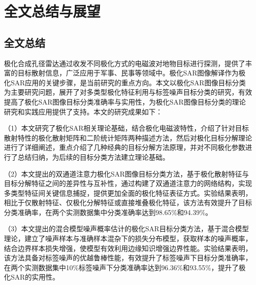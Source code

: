 \chapter{全文总结与展望}
\section{全文总结}
极化合成孔径雷达通过收发不同极化方式的电磁波对地物目标进行探测，提供了丰富的目标散射信息，广泛应用于军事、民事等领域中。极化SAR图像解译作为极化SAR应用的关键步骤，是当前研究的重点方向。本文以极化SAR图像目标分类为主要研究问题，展开了对多类型极化特征利用与标签噪声目标分类的研究，有效提高了极化SAR图像目标分类准确率与实用性，为极化SAR图像目标分类的理论研究和实践应用提供了支持。本文的研究成果如下：


（1）本文研究了极化SAR相关理论基础，结合极化电磁波特性，介绍了针对目标散射特性的极化散射矩阵和二阶统计矩阵两种描述方法，然后对极化目标分解理论进行了详细阐述，重点介绍了几种经典的目标分解方法原理，并对不同极化参数进行了总结归纳，为后续的目标分类方法建立理论基础。

（2）本文提出的双通道注意力极化SAR图像目标分类方法，基于极化散射特征与目标分解特征之间的差异性与互补性，通过构建了双通道注意力的网络结构，实现多类型特征间关键信息捕捉，提供更加全面的极化特征表征方式。实验结果表明，相比于仅散射特征、仅极化分解特征或直接堆叠极化特征，该方法有效提升了目标分类准确率，在两个实测数据集中分类准确率达到98.65\%和94.39\%。

（3）本文提出的混合模型噪声概率估计的极化SAR目标分类方法，基于混合模型理论，建立了噪声样本与准确样本混杂下的损失分布模型，获取样本的噪声概率，结合边界样本损失增强，使模型有效利用边缘知识增强边界性能。实验结果表明，该方法具备对标签噪声的优越鲁棒性能，有效提升了标签噪声下目标分类准确率，在两个实测数据集中10\%标签噪声下分类准确率达到96.36\%和93.55\%，提升了极化SAR的实用性。


